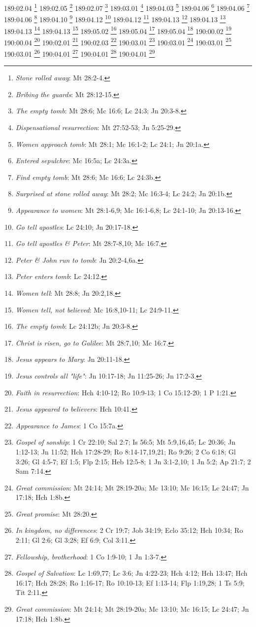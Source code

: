 189:02.04 \footnote{\textit{Stone rolled away}: Mt 28:2-4.}
189:02.05 \footnote{\textit{Bribing the guards}: Mt 28:12-15.}
189:02.07 \footnote{\textit{The empty tomb}: Mt 28:6; Mc 16:6; Lc 24:3; Jn 20:3-8.}
189:03.01 \footnote{\textit{Dispensational resurrection}: Mt 27:52-53; Jn 5:25-29.}
189:04.03 \footnote{\textit{Women approach tomb}: Mt 28:1; Mc 16:1-2; Lc 24:1; Jn 20:1a.}
189:04.06 \footnote{\textit{Entered sepulchre}: Mc 16:5a; Lc 24:3a.}
189:04.06 \footnote{\textit{Find empty tomb}: Mt 28:6; Mc 16:6; Lc 24:3b.}
189:04.06 \footnote{\textit{Surprised at stone rolled away}: Mt 28:2; Mc 16:3-4; Lc 24:2; Jn 20:1b.}
189:04.10 \footnote{\textit{Appearance to women}: Mt 28:1-6,9; Mc 16:1-6,8; Lc 24:1-10; Jn 20:13-16.}
189:04.12 \footnote{\textit{Go tell apostles}: Lc 24:10; Jn 20:17-18.}
189:04.12 \footnote{\textit{Go tell apostles & Peter}: Mt 28:7-8,10; Mc 16:7.}
189:04.13 \footnote{\textit{Peter & John run to tomb}: Jn 20:2-4,6a.}
189:04.13 \footnote{\textit{Peter enters tomb}: Lc 24:12.}
189:04.13 \footnote{\textit{Women tell}: Mt 28:8; Jn 20:2,18.}
189:04.13 \footnote{\textit{Women tell, not believed}: Mc 16:8,10-11; Lc 24:9-11.}
189:05.02 \footnote{\textit{The empty tomb}: Lc 24:12b; Jn 20:3-8.}
189:05.04 \footnote{\textit{Christ is risen, go to Galilee}: Mt 28:7,10; Mc 16:7.}
189:05.04 \footnote{\textit{Jesus appears to Mary}: Jn 20:11-18.}
190:00.02 \footnote{\textit{Jesus controls all "life"}: Jn 10:17-18; Jn 11:25-26; Jn 17:2-3.}
190:00.04 \footnote{\textit{Faith in resurrection}: Hch 4:10-12; Ro 10:9-13; 1 Co 15:12-20; 1 P 1:21.}
190:02.01 \footnote{\textit{Jesus appeared to believers}: Hch 10:41.}
190:02.03 \footnote{\textit{Appearance to James}: 1 Co 15:7a.}
190:03.01 \footnote{\textit{Gospel of sonship}: 1 Cr 22:10; Sal 2:7; Is 56:5; Mt 5:9,16,45; Lc 20:36; Jn 1:12-13; Jn 11:52; Hch 17:28-29; Ro 8:14-17,19,21; Ro 9:26; 2 Co 6:18; Gl 3:26; Gl 4:5-7; Ef 1:5; Flp 2:15; Heb 12:5-8; 1 Jn 3:1-2,10; 1 Jn 5:2; Ap 21:7; 2 Sam 7:14.}
190:03.01 \footnote{\textit{Great commission}: Mt 24:14; Mt 28:19-20a; Mc 13:10; Mc 16:15; Lc 24:47; Jn 17:18; Hch 1:8b.}
190:03.01 \footnote{\textit{Great promise}: Mt 28:20.}
190:03.01 \footnote{\textit{In kingdom, no differences}: 2 Cr 19:7; Job 34:19; Eclo 35:12; Hch 10:34; Ro 2:11; Gl 2:6; Gl 3:28; Ef 6:9; Col 3:11.}
190:04.01 \footnote{\textit{Fellowship, brotherhood}: 1 Co 1:9-10; 1 Jn 1:3-7.}
190:04.01 \footnote{\textit{Gospel of Salvation}: Lc 1:69,77; Lc 3:6; Jn 4:22-23; Hch 4:12; Hch 13:47; Hch 16:17; Hch 28:28; Ro 1:16-17; Ro 10:10-13; Ef 1:13-14; Flp 1:19,28; 1 Ts 5:9; Tit 2:11.}
190:04.01 \footnote{\textit{Great commission}: Mt 24:14; Mt 28:19-20a; Mc 13:10; Mc 16:15; Lc 24:47; Jn 17:18; Hch 1:8b.}
